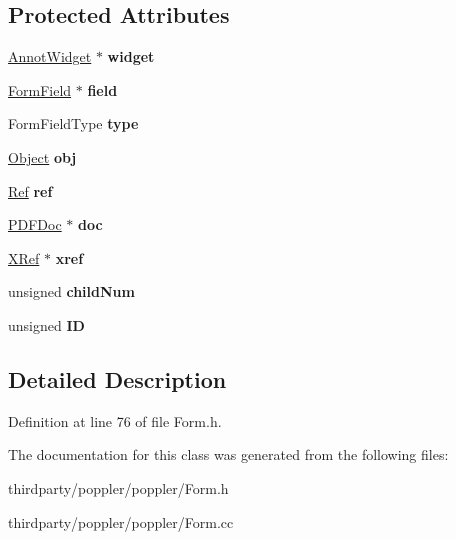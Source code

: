 \subsection*{Protected Attributes}
\begin{DoxyCompactItemize}
\item 
\mbox{\label{class_form_widget_a50f63d8322b6166ce188b0403e9bd1ae}} 
\hyperlink{class_annot_widget}{Annot\+Widget} $\ast$ {\bfseries widget}
\item 
\mbox{\label{class_form_widget_a1ef5c1bc330668e8fd21ae210f82270d}} 
\hyperlink{class_form_field}{Form\+Field} $\ast$ {\bfseries field}
\item 
\mbox{\label{class_form_widget_aae8a31013b6e34b33d6f1f65805781f1}} 
Form\+Field\+Type {\bfseries type}
\item 
\mbox{\label{class_form_widget_a998b17afc139bebe3c86ac64fd1a3e7a}} 
\hyperlink{class_object}{Object} {\bfseries obj}
\item 
\mbox{\label{class_form_widget_aeaeb5d934ed18f4d1a7d390c0a88fcc8}} 
\hyperlink{struct_ref}{Ref} {\bfseries ref}
\item 
\mbox{\label{class_form_widget_a205290e221a77447a3c354187b8c7090}} 
\hyperlink{class_p_d_f_doc}{P\+D\+F\+Doc} $\ast$ {\bfseries doc}
\item 
\mbox{\label{class_form_widget_a319c789fa2388ee0969702777f62046c}} 
\hyperlink{class_x_ref}{X\+Ref} $\ast$ {\bfseries xref}
\item 
\mbox{\label{class_form_widget_a2ed6d30cef0e7ac34759f62bb3815ced}} 
unsigned {\bfseries child\+Num}
\item 
\mbox{\label{class_form_widget_aea23cffb91e05d5c9234687cfad0726c}} 
unsigned {\bfseries ID}
\end{DoxyCompactItemize}


\subsection{Detailed Description}


Definition at line 76 of file Form.\+h.



The documentation for this class was generated from the following files\+:\begin{DoxyCompactItemize}
\item 
thirdparty/poppler/poppler/Form.\+h\item 
thirdparty/poppler/poppler/Form.\+cc\end{DoxyCompactItemize}
